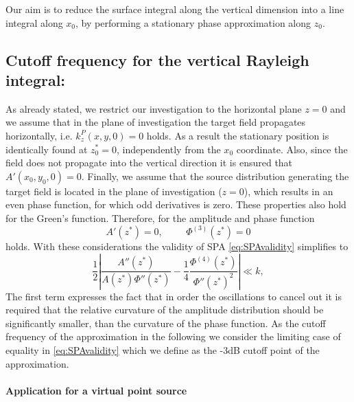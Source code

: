 \documentclass[11pt]{article}
\begin{document}
Our aim is to reduce the surface integral along the vertical dimension into a line integral along $x_0$, by performing a stationary phase approximation along $z_0$.

\subsection{Cutoff frequency for the vertical Rayleigh integral:}
As already stated, we restrict our investigation to the horizontal plane $z = 0$ and we assume that in the plane of investigation the target field propagates horizontally, i.e. $k_z^P(x,y,0) = 0$ holds.
As a result the stationary position is identically found at $z_0^* = 0$, independently from the $x_0$ coordinate.
Also, since the field does not propagate into the vertical direction it is ensured that $A'(x_0,y_0,0) = 0$.
Finally, we assume that the source distribution generating the target field is located in the plane of investigation ($z=0$), which results in an even phase function, for which odd derivatives is zero.
These properties also hold for the Green's function.
Therefore, for the amplitude and phase function 
\begin{equation}
    A'(z^*) = 0, \hspace{1cm} \Phi^{(3)}(z^*) = 0
\end{equation}
holds.
With these considerations the validity of SPA \eqref{eq:SPAvalidity} simplifies to
\begin{equation}
    \frac{1}{2}
    \left| \frac{A''(z^*)}{A(z^*) \Phi''(z^*)}
    -\frac{1}{4}\frac{\Phi^{(4)}(z^*)}{\Phi''(z^*)^2}\right|
    \ll k,
            \label{eq:RayleighValidity}
\end{equation}
The first term expresses the fact that in order the oscillations to cancel out it is required that the relative curvature of the amplitude distribution should be significantly smaller, than the curvature of the phase function.
As the cutoff frequency of the approximation in the following we consider the limiting case of equality in \eqref{eq:SPAvalidity} which we define as the -3dB cutoff point of the approximation.

\paragraph{Application for a virtual point source}
\end{document}
